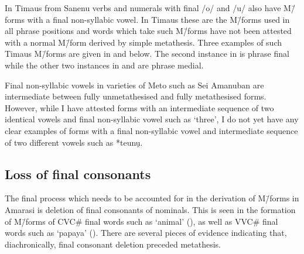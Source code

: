 In Timaus from Sanenu verbs and numerals with final /o/
and /u/ also have M\=/forms with a final non-syllabic vowel.
In Timaus these are the M\=/forms used in all phrase positions
and words which take such M\=/forms have
not been attested with a normal M\=/form derived by simple metathesis.
Three examples of such Timaus M\=/forms are
given in  and
 below.
The second instance in  is phrase
final while the other two instances in 
and  are phrase medial.

\begin{exe}
	\label{ex:FGT-171013-1, 0.31}
	\label{ex:FGT-171016-2, 2.05}
\end{exe}

Final non-syllabic vowels in varieties of Meto such as Se{\Q}i Amanuban
are intermediate between fully unmetathesised and fully metathesised forms.
However, while I have attested forms with
an intermediate sequence of two identical vowels and
final non-syllabic vowel such as  {\ra}
 `three', I do not yet have any clear examples
of forms with a final non-syllabic vowel and intermediate
sequence of two different vowels such as *teunu̯.

\subsection{Loss of final consonants}\label{sec:LosFinCon}
The final process which needs to be accounted
for in the derivation of M\=/forms in Amarasi
is deletion of final consonants of nominals.
This is seen in the formation of M\=/forms of CVC{\#} final words
such as  {\ra}  `animal' (),
as well as VVC{\#} final words such as
 {\ra}  `papaya' ().
There are several pieces of evidence
indicating that, diachronically, final consonant
deletion preceded metathesis.

